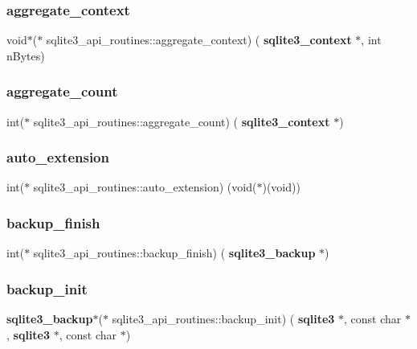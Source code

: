 \subsubsection{aggregate\_context}
{\footnotesize\ttfamily void$\ast$($\ast$ sqlite3\+\_\+api\+\_\+routines\+::aggregate\+\_\+context) (\textbf{ sqlite3\+\_\+context} $\ast$, int n\+Bytes)}

\mbox{\label{structsqlite3__api__routines_aa2f39986a5de8ec01fb5cb2aa573c08d}} 
\subsubsection{aggregate\_count}
{\footnotesize\ttfamily int($\ast$ sqlite3\+\_\+api\+\_\+routines\+::aggregate\+\_\+count) (\textbf{ sqlite3\+\_\+context} $\ast$)}

\mbox{\label{structsqlite3__api__routines_a19d7b88cb46d7c9984c681eaf3ebf1a6}} 
\subsubsection{auto\_extension}
{\footnotesize\ttfamily int($\ast$ sqlite3\+\_\+api\+\_\+routines\+::auto\+\_\+extension) (void($\ast$)(void))}

\mbox{\label{structsqlite3__api__routines_a6ca4fa715197a02df80ee6a9ff58c9d3}} 
\subsubsection{backup\_finish}
{\footnotesize\ttfamily int($\ast$ sqlite3\+\_\+api\+\_\+routines\+::backup\+\_\+finish) (\textbf{ sqlite3\+\_\+backup} $\ast$)}

\mbox{\label{structsqlite3__api__routines_a95aba5aa303ede834a7fc66fa9b33c0a}} 
\subsubsection{backup\_init}
{\footnotesize\ttfamily \textbf{ sqlite3\+\_\+backup}$\ast$($\ast$ sqlite3\+\_\+api\+\_\+routines\+::backup\+\_\+init) (\textbf{ sqlite3} $\ast$, const char $\ast$, \textbf{ sqlite3} $\ast$, const char $\ast$)}

